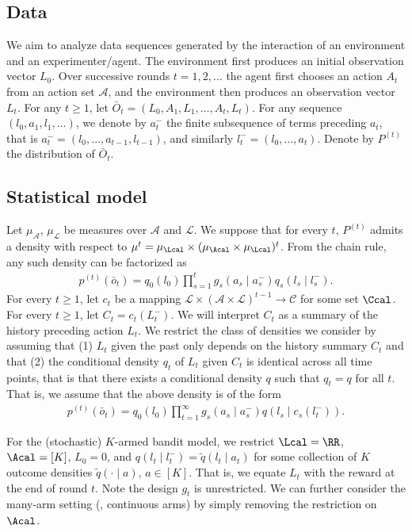 \subsection{Data} We aim to analyze data sequences generated by the interaction of an environment and an experimenter/agent. The environment first produces an initial observation vector $L_0$. Over successive rounds $t=1,2,\ldots$ the agent first chooses an action $A_t$ from an action set $\mathcal{A}$, and the environment then produces an observation vector $L_t$. 
For any $t \geq 1$, let $\bar{O}_t = (L_0,A_1,L_1,\ldots, A_t, L_t)$. For any sequence $(l_0,a_1,l_1,\ldots)$, we denote by $a_t^-$ the finite subsequence of terms preceding $a_t$, that is $a_t^-= (l_0,\ldots, a_{t-1}, l_{t-1})$, and similarly $l_t^- = (l_0,\ldots,a_t)$. Denote by $P^{(t)}$ the distribution of $\bar O_t$.


\subsection{Statistical model} Let $\mu_\mathcal{A}$, $\mu_\mathcal{L}$ be measures over $\mathcal{A}$ and $\mathcal{L}$. We suppose that for every $t$, $P^{(t)}$ admits a density with respect to $\mu^t = \mu_{\Lcal}\times(\mu_{\Acal}\times\mu_{\Lcal})^t$. From the chain rule, any such density can be factorized as
\begin{align*}
    p^{(t)}(\bar o_t) = q_0(l_0) \prod_{s=1}^t g_s(a_s \mid a_s^-) q_s(l_s \mid l_s^-).
\end{align*}
For every $t \geq 1$, let $c_t$ be a mapping $\mathcal{L} \times (\mathcal{A} \times \mathcal{L})^{t-1} \to \mathcal{C}$ for some set $\Ccal$. For every $t \geq 1$, let $C_t = c_t(L_t^-)$. We will interpret $C_t$ as a summary of the history preceding action $L_t$. 
We restrict the class of densities we consider by assuming that (1) $L_t$ given the past only depends on the history summary $C_t$ and that (2) the conditional density $q_t$ of $L_t$ given $C_t$ is identical across all time points, that is that there exists a conditional density $q$ such that $q_t = q$ for all $t$. That is, we assume that the above density is of the form
\begin{align*}
    p^{(t)}(\bar o_t) = q_0(l_0) \prod_{t=1}^\infty g_s(a_s \mid a_s^-) q(l_s \mid c_s(l_t^-)).
\end{align*}


\begin{example}\label{ex:mab} For the (stochastic) $K$-armed bandit model, we restrict $\Lcal=\RR$, $\Acal=[K]$, $L_0=0$, and
$q(l_t \mid l_t^-) = \widetilde q(l_t \mid a_t)$ for some collection of $K$ outcome densities $\widetilde q(\cdot \mid a)$, $a \in [K]$. That is, we equate $L_t$ with the reward at the end of round $t$. Note the design $g_t$ is unrestricted. We can further consider the many-arm setting (\eg, continuous arms) by simply removing the restriction on $\Acal$.\end{example}

